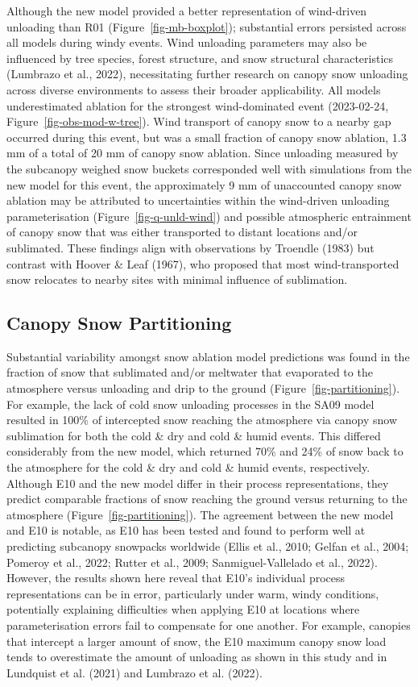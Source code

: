 \documentclass[
]{agujournal2019}
\begin{document}
Although the new model provided a better representation of wind-driven
unloading than R01 (Figure~\ref{fig-mb-boxplot}); substantial errors
persisted across all models during windy events. Wind unloading
parameters may also be influenced by tree species, forest structure, and
snow structural characteristics (Lumbrazo et al., 2022), necessitating
further research on canopy snow unloading across diverse environments to
assess their broader applicability. All models underestimated ablation
for the strongest wind-dominated event (2023-02-24,
Figure~\ref{fig-obs-mod-w-tree}). Wind transport of canopy snow to a
nearby gap occurred during this event, but was a small fraction of
canopy snow ablation, 1.3 mm of a total of 20 mm of canopy snow
ablation. Since unloading measured by the subcanopy weighed snow buckets
corresponded well with simulations from the new model for this event,
the approximately 9 mm of unaccounted canopy snow ablation may be
attributed to uncertainties within the wind-driven unloading
parameterisation (Figure~\ref{fig-q-unld-wind}) and possible atmospheric
entrainment of canopy snow that was either transported to distant
locations and/or sublimated. These findings align with observations by
Troendle (1983) but contrast with Hoover \& Leaf (1967), who proposed
that most wind-transported snow relocates to nearby sites with minimal
influence of sublimation.

\subsection{Canopy Snow Partitioning}\label{canopy-snow-partitioning-1}

Substantial variability amongst snow ablation model predictions was
found in the fraction of snow that sublimated and/or meltwater that
evaporated to the atmosphere versus unloading and drip to the ground
(Figure~\ref{fig-partitioning}). For example, the lack of cold snow
unloading processes in the SA09 model resulted in 100\% of intercepted
snow reaching the atmosphere via canopy snow sublimation for both the
cold \& dry and cold \& humid events. This differed considerably from
the new model, which returned 70\% and 24\% of snow back to the
atmosphere for the cold \& dry and cold \& humid events, respectively.
Although E10 and the new model differ in their process representations,
they predict comparable fractions of snow reaching the ground versus
returning to the atmosphere (Figure~\ref{fig-partitioning}). The
agreement between the new model and E10 is notable, as E10 has been
tested and found to perform well at predicting subcanopy snowpacks
worldwide (Ellis et al., 2010; Gelfan et al., 2004; Pomeroy et al.,
2022; Rutter et al., 2009; Sanmiguel-Vallelado et al., 2022). However,
the results shown here reveal that E10's individual process
representations can be in error, particularly under warm, windy
conditions, potentially explaining difficulties when applying E10 at
locations where parameterisation errors fail to compensate for one
another. For example, canopies that intercept a larger amount of snow,
the E10 maximum canopy snow load tends to overestimate the amount of
unloading as shown in this study and in Lundquist et al. (2021) and
Lumbrazo et al. (2022).
\end{document}
